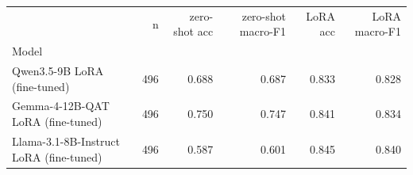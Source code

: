 \begin{tabular}{lrrrrr}
\toprule
 & n & zero-shot acc & zero-shot macro-F1 & LoRA acc & LoRA macro-F1 \\
Model &  &  &  &  &  \\
\midrule
Qwen3.5-9B LoRA (fine-tuned) & 496 & 0.688 & 0.687 & 0.833 & 0.828 \\
Gemma-4-12B-QAT LoRA (fine-tuned) & 496 & 0.750 & 0.747 & 0.841 & 0.834 \\
Llama-3.1-8B-Instruct LoRA (fine-tuned) & 496 & 0.587 & 0.601 & 0.845 & 0.840 \\
\bottomrule
\end{tabular}
